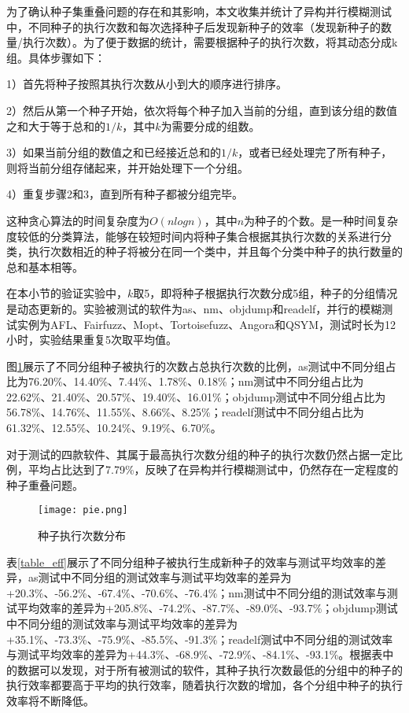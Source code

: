 \documentclass[master]{thesis-uestc}
\begin{document}
为了确认种子集重叠问题的存在和其影响，本文收集并统计了异构并行模糊测试中，不同种子的执行次数和每次选择种子后发现新种子的效率（发现新种子的数量/执行次数）。为了便于数据的统计，需要根据种子的执行次数，将其动态分成k组。具体步骤如下：

1）首先将种子按照其执行次数从小到大的顺序进行排序。

2）然后从第一个种子开始，依次将每个种子加入当前的分组，直到该分组的数值之和大于等于总和的$1/k$，其中$k$为需要分成的组数。

3）如果当前分组的数值之和已经接近总和的$1/k$，或者已经处理完了所有种子，则将当前分组存储起来，并开始处理下一个分组。

4）重复步骤2和3，直到所有种子都被分组完毕。

这种贪心算法的时间复杂度为$O(nlogn)$，其中$n$为种子的个数。是一种时间复杂度较低的分类算法，能够在较短时间内将种子集合根据其执行次数的关系进行分类，执行次数相近的种子将被分在同一个类中，并且每个分类中种子的执行数量的总和基本相等。

在本小节的验证实验中，$k$取5，即将种子根据执行次数分成5组，种子的分组情况是动态更新的。实验被测试的软件为as、nm、objdump和readelf，并行的模糊测试实例为AFL、Fairfuzz、Mopt、Tortoisefuzz、Angora和QSYM，测试时长为12小时，实验结果重复5次取平均值。

图\ref{fenbu}展示了不同分组种子被执行的次数占总执行次数的比例，as测试中不同分组占比为76.20\%、14.40\%、7.44\%、1.78\%、0.18\%；nm测试中不同分组占比为22.62\%、21.40\%、20.57\%、19.40\%、16.01\%；objdump测试中不同分组占比为56.78\%、14.76\%、11.55\%、8.66\%、8.25\%；readelf测试中不同分组占比为61.32\%、12.55\%、10.24\%、9.19\%、6.70\%。

对于测试的四款软件、其属于最高执行次数分组的种子的执行次数仍然占据一定比例，平均占比达到了7.79\%，反映了在异构并行模糊测试中，仍然存在一定程度的种子重叠问题。


\begin{figure}[t]
    \vspace{6pt}
    \centering
    \texttt{[image: pie.png]}
    \caption{种子执行次数分布}
    \label{fenbu}
\end{figure}

表\ref{table_eff}展示了不同分组种子被执行生成新种子的效率与测试平均效率的差异，as测试中不同分组的测试效率与测试平均效率的差异为+20.3\%、-56.2\%、-67.4\%、-70.6\%、-76.4\%；nm测试中不同分组的测试效率与测试平均效率的差异为+205.8\%、-74.2\%、-87.7\%、-89.0\%、-93.7\%；objdump测试中不同分组的测试效率与测试平均效率的差异为+35.1\%、-73.3\%、-75.9\%、-85.5\%、-91.3\%；readelf测试中不同分组的测试效率与测试平均效率的差异为+44.3\%、-68.9\%、-72.9\%、-84.1\%、-93.1\%。根据表中的数据可以发现，对于所有被测试的软件，其种子执行次数最低的分组中的种子的执行效率都要高于平均的执行效率，随着执行次数的增加，各个分组中种子的执行效率将不断降低。
\end{document}
